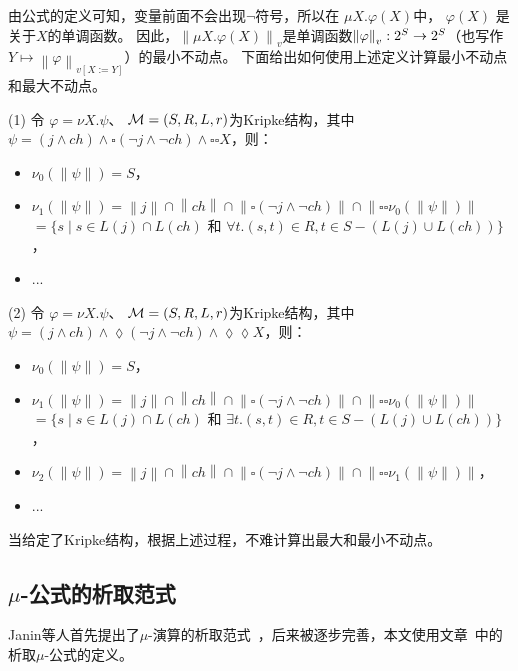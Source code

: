 由公式的定义可知，变量前面不会出现$\neg$符号，所以在 $\mu X. \varphi(X)$中， $\varphi(X)$ 是关于$X$的单调函数。
因此，$\left\| \mu X. \varphi(X)\right\|_v$是单调函数$\left\| \varphi \right\|_{v}: 2^S\rightarrow 2^S$（也写作$Y \mapsto \left\| \varphi\right\|_{v[X:=Y]}$）的最小不动点。
下面给出如何使用上述定义计算最小不动点和最大不动点。
\begin{example}
	(1) 令 $\varphi=\nu X. \psi$、 ${\cal M}=(S, R, L,r)$为Kripke结构，其中$\psi = (j \wedge ch) \wedge \square (\neg j \wedge \neg ch) \wedge \square \square X$，则：
	\begin{itemize}
		\item $\nu_0(\left\| \psi \right\|) = S$，
		\item $\nu_1(\left\| \psi \right\|) = \left\| j \right\| \cap \left\| ch \right\| \cap \left\| \square (\neg j \wedge \neg ch) \right\| \cap \left\| \square \square \nu_0(\left\| \psi \right\|) \right\|$ $=\{s \mid s \in L(j) \cap L(ch)$ 和 $\forall t. (s, t) \in R, t \in S - (L(j) \cup L(ch))\}$，
		\item ...
	\end{itemize}
	(2) 令 $\varphi=\nu X. \psi$、 ${\cal M}=(S, R, L,r)$为Kripke结构，其中$\psi=(j \wedge ch) \wedge \lozenge (\neg j \wedge \neg ch) \wedge \lozenge \lozenge X$，则：
	\begin{itemize}
		\item $\nu_0(\left\| \psi \right\|) = S$，
		\item $\nu_1(\left\| \psi \right\|) = \left\| j \right\| \cap \left\| ch \right\| \cap \left\| \square (\neg j \wedge \neg ch) \right\| \cap \left\| \square \square \nu_0(\left\| \psi \right\|) \right\|$ $=\{s \mid s \in L(j) \cap L(ch)$ 和 $\exists t. (s, t) \in R, t \in S - (L(j) \cup L(ch))\}$，
		\item $\nu_2(\left\| \psi \right\|) = \left\| j \right\| \cap \left\| ch \right\| \cap \left\| \square (\neg j \wedge \neg ch) \right\| \cap \left\| \square \square \nu_1(\left\| \psi \right\|) \right\|$，
		\item ...
	\end{itemize}
当给定了Kripke结构，根据上述过程，不难计算出最大和最小不动点。
\end{example}


\subsection{$\mu$-公式的析取范式}
Janin等人首先提出了$\mu$-演算的析取范式~\cite{janin1995automata}，后来被逐步完善，本文使用文章~\cite{d2006modal}中的析取$\mu$-公式的定义。


